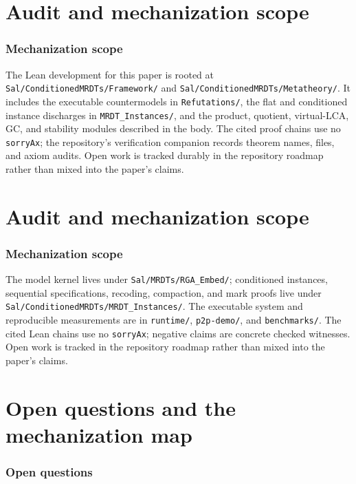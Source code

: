 \documentclass[11pt]{article}
\let\salInlinePart\part
\renewcommand{\part}{\clearpage\salInlinePart}
\newcommand{\lean}[1]{\texttt{#1}}
\begin{document}
\part{Audit and mechanization scope}
\section{Mechanization scope}
\label{sec:mech}\label{sec:open}
\label{oq:causalcanon}\label{oq:compose}\label{oq:rcchain}
The Lean development for this paper is rooted at
\lean{Sal/ConditionedMRDTs/Framework/} and
\lean{Sal/ConditionedMRDTs/Metatheory/}. It includes the executable
countermodels in \lean{Refutations/}, the flat and conditioned instance
discharges in \lean{MRDT\_Instances/}, and the product, quotient, virtual-LCA,
GC, and stability modules described in the body. The cited proof chains use no
\lean{sorryAx}; the repository's verification companion records theorem names,
files, and axiom audits. Open work is tracked durably in the repository roadmap
rather than mixed into the paper's claims.
\else\ifdefined\salPaperB
\part{Audit and mechanization scope}
\section{Mechanization scope}
\label{oq:epochdag}\label{oq:retention}\label{oq:runtable}
\label{oq:seqwitness}\label{oq:starlemma}
The model kernel lives under \lean{Sal/MRDTs/RGA\_Embed/}; conditioned
instances, sequential specifications, recoding, compaction, and mark proofs
live under \lean{Sal/ConditionedMRDTs/MRDT\_Instances/}. The executable system
and reproducible measurements are in \lean{runtime/}, \lean{p2p-demo/}, and
\lean{benchmarks/}. The cited Lean chains use no \lean{sorryAx}; negative
claims are concrete checked witnesses. Open work is tracked in the repository
roadmap rather than mixed into the paper's claims.
\else
\part{Open questions and the mechanization map}

\section{Open questions}
\label{sec:open}
\end{document}
